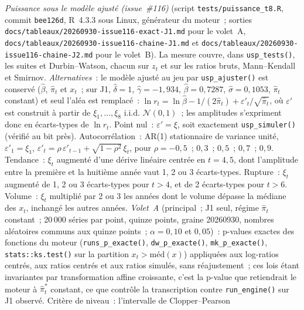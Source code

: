 \documentclass[a4paper,11pt]{article}
\newcommand{\code}[1]{\texttt{\small #1}}
\begin{document}
\noindent\emph{Puissance sous le modèle ajusté (issue~\#116)} (script \code{tests/puissance\_t8.R},
commit \code{bee126d}, R~4.3.3 sous Linux, générateur du moteur~; sorties
\code{docs/tableaux/}\newline \code{20260930-issue116-exact-J1.md} pour le volet~A,
\code{docs/tableaux/}\newline \code{20260930-issue116-chaine-J1.md} et
\code{docs/tableaux/}\newline \code{20260930-issue116-chaine-J2.md} pour le volet~B). La mesure couvre, dans
\code{usp\_tests()}, les suites et Durbin--Watson, chacun sur $z_t$ et sur les ratios bruts,
Mann--Kendall et Smirnov. \emph{Alternatives}~: le modèle ajusté au jeu par
\code{usp\_ajuster()} est conservé ($\hat\beta$, $\hat\pi_t$ et $x_t$~; sur J1, $\hat\delta = 1$,
$\hat\gamma = -1{,}934$, $\hat\beta = 0{,}7287$, $\hat\sigma = 0{,}1053$, $\hat\pi_t$ constant) et
seul l'aléa est remplacé~: $\ln r_t = \ln\hat\beta - 1/(2\hat\pi_t) + \varepsilon'_t/\sqrt{\hat\pi_t}$,
où $\varepsilon'$ est construit à partir de $\xi_1, \dots, \xi_8$ i.i.d. $\mathcal{N}(0,1)$~; les
amplitudes s'expriment donc en écarts-types de $\ln r_t$. Point nul~: $\varepsilon' = \xi$, soit
exactement \code{usp\_simuler()} (vérifié au bit près). Autocorrélation~: AR(1) stationnaire de
variance unité, $\varepsilon'_1 = \xi_1$, $\varepsilon'_t = \rho\,\varepsilon'_{t-1} +
\sqrt{1-\rho^2}\,\xi_t$, pour $\rho = -0{,}5$~; $0{,}3$~; $0{,}5$~; $0{,}7$~; $0{,}9$. Tendance~: $\xi_t$
augmenté d'une dérive linéaire centrée en $t = 4{,}5$, dont l'amplitude entre la première et la
huitième année vaut 1, 2 ou 3 écarts-types. Rupture~: $\xi_t$ augmenté de 1, 2 ou 3 écarts-types
pour $t > 4$, et de 2 écarts-types pour $t > 6$. Volume~: $\xi_t$ multiplié par 2 ou 3 les années
dont le volume dépasse la médiane des $x_t$, inchangé les autres années. \emph{Volet~A}
(principal~; J1 seul, régime $\hat\pi_t$ constant~; 20\,000 séries par point, quinze points,
graine 20260930, nombres aléatoires communs aux quinze points~; $\alpha = 0{,}10$ et $0{,}05$)~:
p-values exactes des fonctions du moteur (\code{runs\_p\_exacte()}, \code{dw\_p\_exacte()},
\code{mk\_p\_exacte()}, \code{stats::ks.test()} sur la partition $x_t > \mathrm{méd}(x)$)
appliquées aux log-ratios centrés, aux ratios centrés et aux ratios simulés, sans
réajustement~; ces lois étant invariantes par transformation affine croissante, c'est la p-value
que retiendrait le moteur à $\hat\pi^*_t$ constant, ce que contrôle la transcription contre
\code{run\_engine()} sur J1 observé. Critère de niveau~: l'intervalle de Clopper--Pearson
\end{document}
